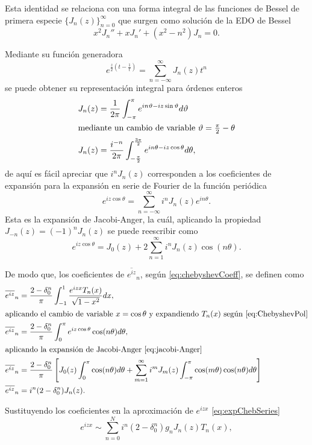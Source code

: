 Esta identidad se relaciona con una forma integral de las funciones de Bessel de primera 
especie $\{J_n(z)\}_{n=0}^\infty$ que surgen como solución de la EDO de Bessel \autocite{Hassani2013}
\begin{equation*}
	x^2J_n'' + xJ_n' + (x^2 - n^2)J_n = 0.
\end{equation*}

Mediante su función generadora
\begin{equation*}
	e^{\frac{z}{2} \left(t - \frac{1}{t}\right)} = \sum_{n=-\infty}^{\infty} J_n(z)t^n
\end{equation*}
se puede obtener su representación integral para órdenes enteros
\begin{align*}
	J_n(z) &= \frac{1}{2\pi} \int_{-\pi}^{\pi} e^{in\vartheta - iz\sin\vartheta} d\vartheta\\
	\intertext{mediante un cambio de variable $\vartheta = \frac{\pi}{2} - \theta$}
	J_n(z) &= \frac{i^{-n}}{2\pi} \int_{-\frac{\pi}{2}}^{\frac{3\pi}{2}} e^{in\theta - iz\cos\theta} d\theta,
\end{align*}
de aquí es fácil apreciar que $i^n J_n(z)$ corresponden a los coeficientes de expansión para la expansión en 
serie de Fourier de la función periódica
\begin{equation*}
	e^{iz\cos\theta} = \sum_{n=-\infty}^{\infty} i^n J_n(z) e^{in\theta}.
\end{equation*}
Esta es la expansión de Jacobi-Anger, la cuál, aplicando la propiedad $J_{-n}(z) = (-1)^nJ_n(z)$ se puede reescribir como
\begin{equation}\label{eq:jacobi-Anger}
	e^{iz\cos\theta} = J_0(z) + 2\sum_{n=1}^{\infty} i^n J_n(z) \cos(n\theta).
\end{equation}

De modo que, los coeficientes de $\overline{e^{iz}}_n$, según \eqref{eq:chebyshevCoeff}, se definen como
\begin{align*}
	\overline{e^{iz}}_n &= \frac{2 - \delta^n_0}{\pi} \int_{-1}^{1} \frac{e^{izx}T_n(x)}{\sqrt{1-x^2}} dx, \\ 
	\intertext{aplicando el cambio de variable $x = \cos\theta$ y expandiendo $T_n(x)$ según \eqref{eq:ChebyshevPol}}
	\overline{e^{iz}}_n &= \frac{2 - \delta^n_0}{\pi} \int_{0}^{\pi} e^{iz\cos\theta}\cos(n\theta) d\theta, \\
	\intertext{aplicando la expansión de Jacobi-Anger \eqref{eq:jacobi-Anger}}
	\overline{e^{iz}}_n &= \frac{2 - \delta^n_0}{\pi} \left[ J_0(z) \int_{0}^{\pi} \cos(n\theta) d\theta + \sum_{m=1}^{\infty} i^m J_m(z) \int_{-\pi}^{\pi} \cos(m\theta)\cos(n\theta) d\theta \right]  \\ 
 	\overline{e^{iz}}_n &= i^n (2 - \delta^n_0) J_n(z). \\ 
\end{align*}

Sustituyendo los coeficientes en la aproximación de $e^{izx}$ \eqref{eq:expChebSeries}
\begin{equation}\label{eq:iexpChebExpan}
	e^{izx} \sim \sum_{n=0}^{N} i^n (2 - \delta^n_0) g_n J_n(z) T_n(x),
\end{equation}
